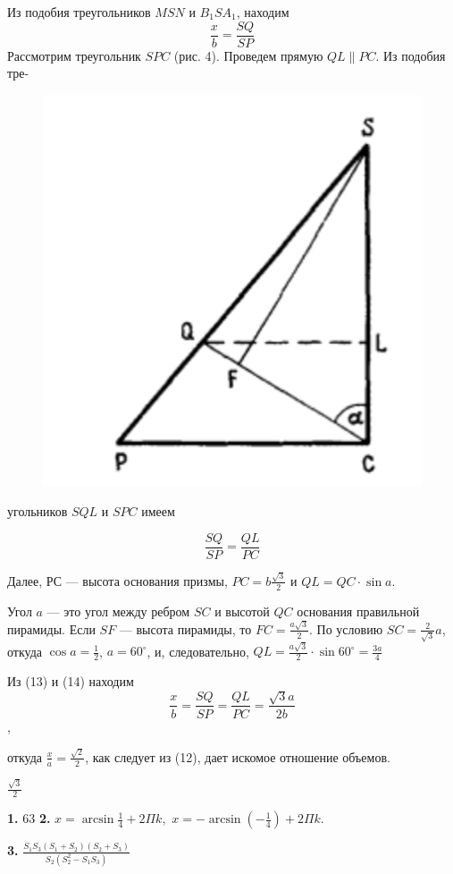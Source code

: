 \documentclass[a4paper, 12pt]{article}
\begin{document}
\begin{multicols}{2}
	\columnbreak
	\noindent
	Из подобия треугольников $MSN$ и $B_1SA_1$, находим
	$$\frac{x}{b} = \frac{SQ}{SP}$$
	Рассмотрим треугольник $SPC$ (рис. 4). Проведем прямую $QL \parallel PC$. Из подобия тре-
	\begin{figure}[H]
		\centering
		\includegraphics[width=.4\linewidth]{Image4.jpg}
		\caption{}
	\end{figure}
	\noindent
	угольников $SQL$ и $SPC$ имеем
	
	$$\frac{SQ}{SP} = \frac{QL}{PC}$$
	
	Далее,  $РС$ --- высота основания призмы, $PC = b\frac{\sqrt3}{2}$ и $QL = QC \cdot \sin{a}$.
	
	Угол $a$ --- это угол между ребром $SC$ и высотой $QC$ основания правильной пирамиды. Если $SF$ — высота пирамиды, то $FC = \frac{a\sqrt3}{2}$. По условию $SC = \frac{2}{\sqrt3}a$, откуда $\cos{a} = \frac12$, $a = 60^\circ$, и, следовательно, $QL = \frac{a\sqrt3}{2} \cdot \sin{60^\circ} = \frac{3a}{4}$
	
	Из (13) и (14) находим
	$$\frac{x}{b} = \frac{SQ}{SP} = \frac{QL}{PC} = \frac{\sqrt3a}{2b}$$,
	
	откуда $\frac{x}{a} = \frac{\sqrt2}{2}$, как следует из (12), дает искомое отношение объемов.
	
	 $\frac{\sqrt3}{2}$
	
	\centering{}
	
	{\bfseries 1.} $63$ {\bfseries 2.} $x = \arcsin{\frac14} + 2\Pi k,$ $x = -\arcsin{\left( -\frac14 \right)}+ 2\Pi k.$
	
	{\bfseries 3.} $\frac{S_1S_3(S_1 + S_2)(S_2 + S_3)}{S_2(S_2^2 - S_1S_3)}$
\end{multicols}

\newpage
\setcounter{page}{17}
\pagestyle{myfooter2}
\vspace*{\fill}
\end{document}
